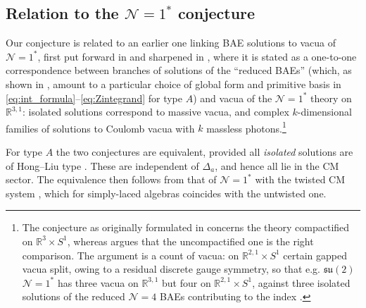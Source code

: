 \documentclass[aps, prx, nofootinbib, twocolumn,amsfonts,amsmath,amssymb,mathtools,superscriptaddress,preprintnumbers,floatfix,reprint]{revtex4-2}
\begin{document}
\subsection{Relation to the \texorpdfstring{$\mathcal{N}=1^\ast$}{N=1*}
conjecture}
\label{sub:N1star}

Our conjecture is related to an earlier one linking BAE solutions to vacua of
$\mathcal{N}=1^\ast$, first put forward in \cite{ArabiArdehali:2019orz} and
sharpened in \cite{Benini:2021ano}, where it is stated as a one-to-one
correspondence between branches of solutions of the ``reduced BAEs'' (which, as shown in \cite{B2paper}, amount to a particular choice of global form and primitive basis in \eqref{eq:int_formula}--\eqref{eq:Zintegrand} for type $A$) and vacua of
the $\mathcal{N}=1^\ast$ theory on $\mathbb{R}^{3,1}$: isolated solutions
correspond to massive vacua, and complex $k$-dimensional families of solutions
to Coulomb vacua with $k$ massless photons.\footnote{The conjecture as originally formulated in \cite[Sec. 2.1.1]{ArabiArdehali:2019orz}
concerns the theory compactified on $\mathbb{R}^3\times S^1$, whereas
\cite{Benini:2021ano} argues that the uncompactified one is the right comparison.
The argument is a count of vacua: on $\mathbb{R}^{2,1}\times S^1$ certain gapped
vacua split, owing to a residual discrete gauge symmetry, so that e.g.
$\mathfrak{su}(2)$ $\mathcal{N}=1^\ast$ has three vacua on $\mathbb{R}^{3,1}$
but four on $\mathbb{R}^{2,1}\times S^1$, against three isolated solutions of
the reduced $\mathcal{N}=4$ BAEs contributing to the index \cite[footnote~5]{Benini:2021ano}.}

For type $A$ the two conjectures are equivalent, provided all \emph{isolated} solutions are of Hong--Liu type \cite{Hong:2018viz}. These are independent
of $\Delta_a$, and hence all lie in the CM sector. The equivalence then follows
from that of $\mathcal{N}=1^\ast$ with the twisted CM system
\cite{Dorey:1999sj,DHoker:1998zuv,Kumar:2001iu}, which for simply-laced algebras coincides
with the untwisted one.
\end{document}
